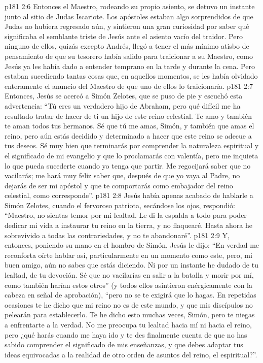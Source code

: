 \vs p181 2:6 \pc Entonces el Maestro, rodeando su propio asiento, se detuvo un instante junto al sitio de Judas Iscariote. Los apóstoles estaban algo sorprendidos de que Judas no hubiera regresado aún, y sintieron una gran curiosidad por saber qué significaba el semblante triste de Jesús ante el asiento vacío del traidor. Pero ninguno de ellos, quizás excepto Andrés, llegó a tener el más mínimo atisbo de pensamiento de que su tesorero había salido para traicionar a su Maestro, como Jesús ya les había dado a entender temprano en la tarde y durante la cena. Pero estaban sucediendo tantas cosas que, en aquellos momentos, se les había olvidado enteramente el anuncio del Maestro de que uno de ellos lo traicionaría.
\vs p181 2:7 \pc Entonces, Jesús se acercó a Simón Zelotes, que se puso de pie y escuchó esta advertencia: “Tú eres un verdadero hijo de Abraham, pero qué difícil me ha resultado tratar de hacer de ti un hijo de este reino celestial. Te amo y también te aman todos tus hermanos. Sé que tú me amas, Simón, y también que amas el reino, pero aún estás decidido y determinado a hacer que este reino se adecue a tus deseos. Sé muy bien que terminarás por comprender la naturaleza espiritual y el significado de mi evangelio y que lo proclamarás con valentía, pero me inquieta lo que pueda sucederte cuando yo tenga que partir. Me regocijará saber que no vacilarás; me hará muy feliz saber que, después de que yo vaya al Padre, no dejarás de ser mi apóstol y que te comportarás como embajador del reino celestial, como corresponde”.
\vs p181 2:8 Jesús había apenas acabado de hablarle a Simón Zelotes, cuando el fervoroso patriota, secándose los ojos, respondió: “Maestro, no sientas temor por mi lealtad. Le di la espalda a todo para poder dedicar mi vida a instaurar tu reino en la tierra, y no flaquearé. Hasta ahora he sobrevivido a todas las contrariedades, y no te abandonaré”.
\vs p181 2:9 Y, entonces, poniendo su mano en el hombro de Simón, Jesús le dijo: “En verdad me reconforta oírte hablar así, particularmente en un momento como este, pero, mi buen amigo, aún no sabes que estás diciendo. Ni por un instante he dudado de tu lealtad, de tu devoción. Sé que no vacilarías en salir a la batalla y morir por mí, como también harían estos otros” (y todos ellos asintieron enérgicamente con la cabeza en señal de aprobación), “pero no se te exigirá que lo hagas. En repetidas ocasiones te he dicho que mi reino no es de este mundo, y que mis discípulos no pelearán para establecerlo. Te he dicho esto muchas veces, Simón, pero te niegas a enfrentarte a la verdad. No me preocupa tu lealtad hacia mí ni hacia el reino, pero ¿qué harás cuando me haya ido y te des finalmente cuenta de que no has sabido comprender el significado de mis enseñanzas, y que debes adaptar tus ideas equivocadas a la realidad de otro orden de asuntos del reino, el espiritual?”.
